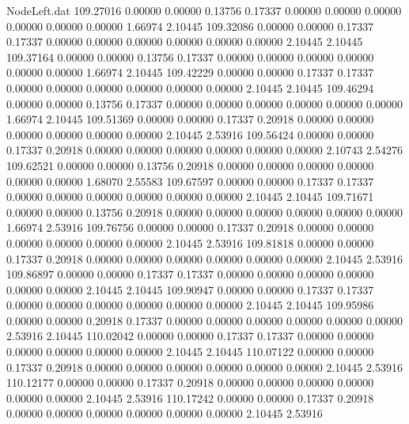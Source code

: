 \begin{filecontents}{NodeLeft.dat}
 109.27016    0.00000    0.00000     0.13756    0.17337    0.00000    0.00000    0.00000    0.00000    0.00000    0.00000    1.66974    2.10445
 109.32086    0.00000    0.00000     0.17337    0.17337    0.00000    0.00000    0.00000    0.00000    0.00000    0.00000    2.10445    2.10445
 109.37164    0.00000    0.00000     0.13756    0.17337    0.00000    0.00000    0.00000    0.00000    0.00000    0.00000    1.66974    2.10445
 109.42229    0.00000    0.00000     0.17337    0.17337    0.00000    0.00000    0.00000    0.00000    0.00000    0.00000    2.10445    2.10445
 109.46294    0.00000    0.00000     0.13756    0.17337    0.00000    0.00000    0.00000    0.00000    0.00000    0.00000    1.66974    2.10445
 109.51369    0.00000    0.00000     0.17337    0.20918    0.00000    0.00000    0.00000    0.00000    0.00000    0.00000    2.10445    2.53916
 109.56424    0.00000    0.00000     0.17337    0.20918    0.00000    0.00000    0.00000    0.00000    0.00000    0.00000    2.10743    2.54276
 109.62521    0.00000    0.00000     0.13756    0.20918    0.00000    0.00000    0.00000    0.00000    0.00000    0.00000    1.68070    2.55583
 109.67597    0.00000    0.00000     0.17337    0.17337    0.00000    0.00000    0.00000    0.00000    0.00000    0.00000    2.10445    2.10445
 109.71671    0.00000    0.00000     0.13756    0.20918    0.00000    0.00000    0.00000    0.00000    0.00000    0.00000    1.66974    2.53916
 109.76756    0.00000    0.00000     0.17337    0.20918    0.00000    0.00000    0.00000    0.00000    0.00000    0.00000    2.10445    2.53916
 109.81818    0.00000    0.00000     0.17337    0.20918    0.00000    0.00000    0.00000    0.00000    0.00000    0.00000    2.10445    2.53916
 109.86897    0.00000    0.00000     0.17337    0.17337    0.00000    0.00000    0.00000    0.00000    0.00000    0.00000    2.10445    2.10445
 109.90947    0.00000    0.00000     0.17337    0.17337    0.00000    0.00000    0.00000    0.00000    0.00000    0.00000    2.10445    2.10445
 109.95986    0.00000    0.00000     0.20918    0.17337    0.00000    0.00000    0.00000    0.00000    0.00000    0.00000    2.53916    2.10445
 110.02042    0.00000    0.00000     0.17337    0.17337    0.00000    0.00000    0.00000    0.00000    0.00000    0.00000    2.10445    2.10445
 110.07122    0.00000    0.00000     0.17337    0.20918    0.00000    0.00000    0.00000    0.00000    0.00000    0.00000    2.10445    2.53916
 110.12177    0.00000    0.00000     0.17337    0.20918    0.00000    0.00000    0.00000    0.00000    0.00000    0.00000    2.10445    2.53916
 110.17242    0.00000    0.00000     0.17337    0.20918    0.00000    0.00000    0.00000    0.00000    0.00000    0.00000    2.10445    2.53916

\end{filecontents}
